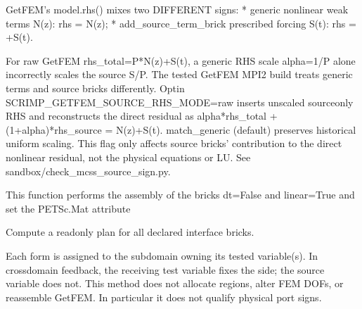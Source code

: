 \documentclass[letterpaper,10pt,english]{sphinxmanual}
\begin{document}
\begin{fulllineitems}
\begin{fulllineitems}
\sphinxAtStartPar
GetFEM’s model.rhs() mixes two DIFFERENT signs:
* generic nonlinear weak terms N(z): rhs = \sphinxhyphen{}N(z);
* add\_source\_term\_brick prescribed forcing S(t): rhs = +S(t).

\sphinxAtStartPar
For raw GetFEM rhs\_total=\sphinxhyphen{}P*N(z)+S(t), a generic RHS scale
alpha=1/P alone incorrectly scales the source S/P. The tested
GetFEM MPI\sphinxhyphen{}2 build treats generic terms and source bricks
differently. Opt\sphinxhyphen{}in SCRIMP\_GETFEM\_SOURCE\_RHS\_MODE=raw inserts
unscaled source\sphinxhyphen{}only RHS and reconstructs the direct residual as
\sphinxhyphen{}alpha*rhs\_total + (1+alpha)*rhs\_source = N(z)+S(t).
match\_generic (default) preserves historical uniform scaling.
This flag only affects source bricks’ contribution to the
direct nonlinear residual, not the physical equations or LU.
See sandbox/check\_mcss\_source\_sign.py.

\end{fulllineitems}


\begin{fulllineitems}
\label{\detokenize{scrimp:scrimp.dphs.DPHS.assemble_stiffness}}
\pysigstartsignatures
\pysiglinewithargsret
{}
{}
{}
\pysigstopsignatures
\sphinxAtStartPar
This function performs the assembly of the bricks dt=False and linear=True and set the PETSc.Mat attribute 

\end{fulllineitems}


\begin{fulllineitems}
\label{\detokenize{scrimp:scrimp.dphs.DPHS.audit_interface_brick_plan}}
\pysigstartsignatures
\pysiglinewithargsret
{}
{\sphinxparamcomma {}\sphinxparamcomma {}}
{}
\pysigstopsignatures
\sphinxAtStartPar
Compute a read\sphinxhyphen{}only plan for all declared interface bricks.

\sphinxAtStartPar
Each form is assigned to the subdomain owning its tested
variable(s). In cross\sphinxhyphen{}domain feedback, the receiving test
variable fixes the side; the source variable does not. This
method does not allocate regions, alter FEM DOFs, or reassemble
GetFEM. In particular it does not qualify physical port signs.


\end{fulllineitems}
\end{fulllineitems}
\end{document}
